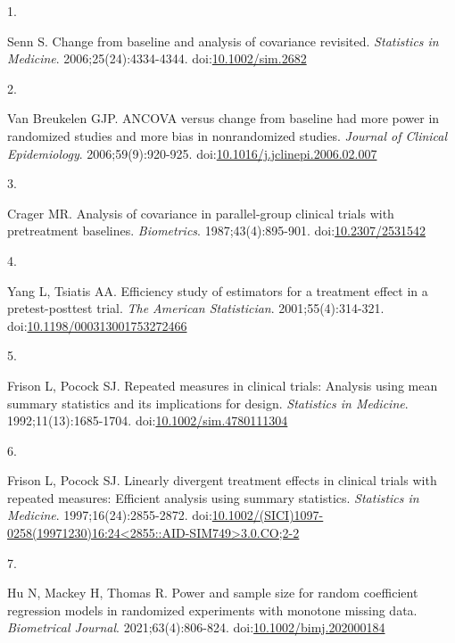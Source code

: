 \documentclass[
  11pt,
]{article}
\newlength{\cslhangindent}
\newlength{\csllabelwidth}
\newenvironment{CSLReferences}[2] %
 {\begin{list}{}{%
  \setlength{\itemindent}{0pt}
  \setlength{\leftmargin}{0pt}
  \setlength{\parsep}{0pt}
  \ifodd #1
   \setlength{\leftmargin}{\cslhangindent}
   \setlength{\itemindent}{-1\cslhangindent}
  \fi
  \setlength{\itemsep}{#2\baselineskip}}}
 {\end{list}}
\newcommand{\CSLLeftMargin}[1]{\parbox[t]{\csllabelwidth}{\strut#1\strut}}
\newcommand{\CSLRightInline}[1]{\parbox[t]{\linewidth - \csllabelwidth}{\strut#1\strut}}
\begin{document}
\protect{}\label{refs}
\begin{CSLReferences}{0}{1}
\CSLLeftMargin{1. }%
\CSLRightInline{Senn S. Change from baseline and analysis of covariance revisited. \emph{Statistics in Medicine}. 2006;25(24):4334-4344. doi:\href{https://doi.org/10.1002/sim.2682}{10.1002/sim.2682}}

\CSLLeftMargin{2. }%
\CSLRightInline{Van Breukelen GJP. {ANCOVA} versus change from baseline had more power in randomized studies and more bias in nonrandomized studies. \emph{Journal of Clinical Epidemiology}. 2006;59(9):920-925. doi:\href{https://doi.org/10.1016/j.jclinepi.2006.02.007}{10.1016/j.jclinepi.2006.02.007}}

\CSLLeftMargin{3. }%
\CSLRightInline{Crager MR. Analysis of covariance in parallel-group clinical trials with pretreatment baselines. \emph{Biometrics}. 1987;43(4):895-901. doi:\href{https://doi.org/10.2307/2531542}{10.2307/2531542}}

\CSLLeftMargin{4. }%
\CSLRightInline{Yang L, Tsiatis AA. Efficiency study of estimators for a treatment effect in a pretest-posttest trial. \emph{The American Statistician}. 2001;55(4):314-321. doi:\href{https://doi.org/10.1198/000313001753272466}{10.1198/000313001753272466}}

\CSLLeftMargin{5. }%
\CSLRightInline{Frison L, Pocock SJ. Repeated measures in clinical trials: Analysis using mean summary statistics and its implications for design. \emph{Statistics in Medicine}. 1992;11(13):1685-1704. doi:\href{https://doi.org/10.1002/sim.4780111304}{10.1002/sim.4780111304}}

\CSLLeftMargin{6. }%
\CSLRightInline{Frison L, Pocock SJ. Linearly divergent treatment effects in clinical trials with repeated measures: Efficient analysis using summary statistics. \emph{Statistics in Medicine}. 1997;16(24):2855-2872. doi:\href{https://doi.org/10.1002/(SICI)1097-0258(19971230)16:24\%3C2855::AID-SIM749\%3E3.0.CO;2-2}{10.1002/(SICI)1097-0258(19971230)16:24\textless2855::AID-SIM749\textgreater3.0.CO;2-2}}

\CSLLeftMargin{7. }%
\CSLRightInline{Hu N, Mackey H, Thomas R. Power and sample size for random coefficient regression models in randomized experiments with monotone missing data. \emph{Biometrical Journal}. 2021;63(4):806-824. doi:\href{https://doi.org/10.1002/bimj.202000184}{10.1002/bimj.202000184}}


\end{CSLReferences}
\end{document}
